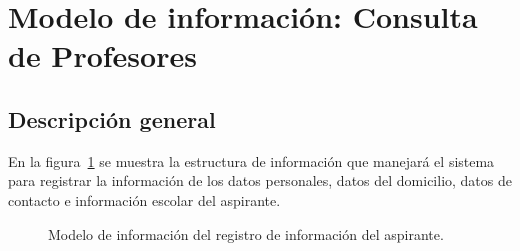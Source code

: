 \newpage

\section{Modelo de información: Consulta de Profesores}

\subsection{Descripción general}

En la figura~\ref{fig:registroInfoAspirante} se muestra la estructura de información que manejará el sistema para registrar la información de los datos personales, datos del domicilio, datos de contacto e información escolar del aspirante.

\begin{figure}[htbp!]
	\begin{center}
		\caption{Modelo de información del registro de información del aspirante.}
		\label{fig:registroInfoAspirante}
	\end{center}
\end{figure}


